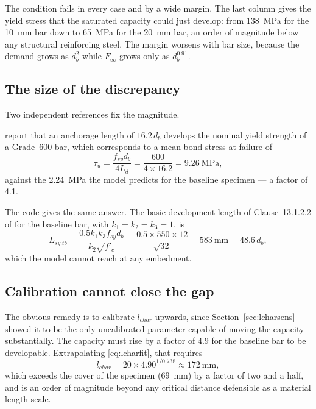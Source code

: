 The condition fails in every case and by a wide margin. The last column
gives the yield stress that the saturated capacity could just develop: from
\SI{138}{\mega\pascal} for the \SI{10}{\milli\metre} bar down to
\SI{65}{\mega\pascal} for the \SI{20}{\milli\metre} bar, an order of
magnitude below any structural reinforcing steel. The margin worsens with
bar size, because the demand grows as $d_b^2$ while $F_\infty$ grows only as
$d_b^{0.91}$.

\subsection{The size of the discrepancy}

Two independent references fix the magnitude.

\textcite{fosterDevelopmentLapLengths} report that an anchorage length of
$16.2\,d_b$ develops the nominal yield strength of a Grade~600 bar, which
corresponds to a mean bond stress at failure of
\begin{equation}
\tau_u = \frac{f_{sy} d_b}{4 L_d}
       = \frac{600}{4 \times 16.2}
       = \SI{9.26}{\mega\pascal},
\end{equation}
against the \SI{2.24}{\mega\pascal} the model predicts for the baseline
specimen --- a factor of \num{4.1}.

The code gives the same answer. The basic development length of
Clause~13.1.2.2 of \textcite{as3600ConcreteStructures2018} for the baseline
bar, with $k_1 = k_2 = k_3 = 1$, is
\begin{equation}
\label{eq:as3600ld}
L_{sy.tb} = \frac{0.5 k_1 k_3 f_{sy} d_b}{k_2 \sqrt{f'_c}}
          = \frac{0.5 \times 550 \times 12}{\sqrt{32}}
          = \SI{583}{\milli\metre} = 48.6\,d_b ,
\end{equation}
which the model cannot reach at any embedment.

\subsection{Calibration cannot close the gap}

The obvious remedy is to calibrate $l_{char}$ upwards, since
Section~\ref{sec:lcharsens} showed it to be the only uncalibrated parameter
capable of moving the capacity substantially. The capacity must rise by a
factor of \num{4.9} for the baseline bar to be developable. Extrapolating
\eqref{eq:lcharfit}, that requires
\begin{equation}
\label{eq:lcharneeded}
l_{char} = 20 \times 4.90^{1/0.738} \approx \SI{172}{\milli\metre},
\end{equation}
which exceeds the cover of the specimen (\SI{69}{\milli\metre}) by a factor
of two and a half, and is an order of magnitude beyond any critical distance
defensible as a material length scale.

